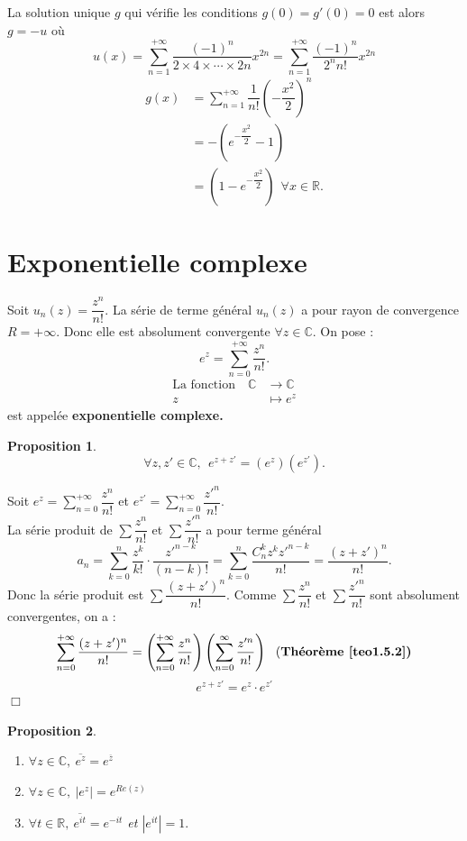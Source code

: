 \documentclass[11pt, a4paper]{book}
\newtheorem{pro}{Proposition}[section]
\newenvironment{pr}{\noindent {\bf Preuve} \noindent} {\hfill $\Box$\vskip 5mm}
\begin{document}
La solution unique $g$ qui v\'erifie les conditions $g(0)=g'(0)=0$ est alors $g=-u$ o\`u $$u(x)=\sum_{n=1}^{+\infty}\dfrac{(-1)^n}{2\times4\times\cdots\times2n}x^{2n}=\sum_{n=1}^{+\infty}\dfrac{(-1)^n}{2^nn!}x^{2n}$$ \begin{align*}
g(x)&=\sum_{n=1}^{+\infty}\dfrac{1}{n!}\left(-\dfrac{x^2}{2}\right)^n\\&=-\left(e^{-\dfrac{x^2}{2}}-1\right)\\&=\left(1-e^{-\dfrac{x^2}{2}}\right)~~\forall x\in \mathbb{R}.
\end{align*}
\section{Exponentielle complexe}  \label{para5.4}
Soit $u_n(z)=\dfrac{z^n}{n!}.$ La s\'erie de terme g\'en\'eral $u_n(z)$ a pour rayon de convergence $R=+\infty$. Donc elle est absolument convergente $\forall z\in \mathbb{C}.$ On pose : $$e^z=\sum_{n=0}^{+\infty}\dfrac{z^n}{n!}.$$ 
\begin{align*}
\text{La fonction}\quad\mathbb{C}&\rightarrow\mathbb{C}\\z&\mapsto e^z
\end{align*}   est appel\'ee \textbf{exponentielle complexe.}
\begin{pro} \label{pro5.7.1} $$ \forall z,z'\in \mathbb{C}, ~~e^{z+z'}=\left(e^z\right)\left(e^{z'}\right).$$ \end{pro}
\begin{pr}\quad
Soit ${\displaystyle e^z=\sum_{n=0}^{+\infty}\dfrac{z^n}{n!}}$ et ${\displaystyle e^{z'}=\sum_{n=0}^{+\infty}\dfrac{z'^n}{n!}.}$\\ La s\'erie produit de $\sum \dfrac{z^n}{n!}$ et $\sum\dfrac{z'^n}{n!}$ a pour terme g\'en\'eral $$ a_n=\sum_{k=0}^n\dfrac{z^k}{k!}\cdot\dfrac{z'^{n-k}}{(n-k)!}=\sum_{k=0}^n\dfrac{C_n^kz^kz'^{n-k}}{n!}=\dfrac{(z+z')^n}{n!}.$$ Donc la s\'erie produit est $\sum \dfrac{(z+z')^n}{n!}.$ Comme $\sum\dfrac{z^n}{n!}$ et $\sum\dfrac{z'^n}{n!}$ sont absolument convergentes, on a : $$\sum_{n=0}^{+\infty}\dfrac{(z+z')^n}{n!}=\left(\sum_{n=0}^{+\infty}\dfrac{z^n}{n!}\right)\left(\sum_{n=0}^{\infty}\dfrac{z'^n}{n!}\right)~~\text{(\textbf{Th\'eor\`eme \ref{teo1.5.2})}}$$ $$e^{z+z'}=e^z\cdot e^{z'}$$
\end{pr}
\begin{pro} \label{pro5.7.2} \begin{enumerate}
\item $\forall z\in \mathbb{C},~\overline{e^z}=e^{\overline{z}}$
\item $\forall z\in \mathbb{C},~|e^z|=e^{Re(z)}$
\item $\forall t\in \mathbb{R},~\overline{e^{it}}=e^{-it}$ et $|e^{it}|=1.$
\end{enumerate}
\end{pro}
\end{document}
